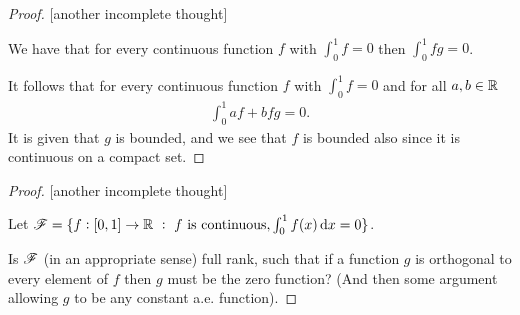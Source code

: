 \begin{proof}

  [another incomplete thought]

  We have that for every continuous function $f$ with $\int_0^1 f = 0$ then $\int_0^1 fg = 0$.

  It follows that for every continuous function $f$ with $\int_0^1 f = 0$ and for all $a, b \in \mathbb{R}$
  \begin{align*}
    \int_0^1 af + bfg = 0.
  \end{align*}
  It is given that $g$ is bounded, and we see that $f$ is bounded also since it is continuous on a compact set.

\end{proof}


\begin{proof}

  [another incomplete thought]

  Let $\ms F = \{f: [0, 1] \to \R ~:~ f \text{~is continuous}, \int_0^1 f(x) \dx = 0 \}$.

  Is $\mathscr F$ (in an appropriate sense) full rank, such that if a function $g$ is orthogonal to every element
  of $f$ then $g$ must be the zero function? (And then some argument allowing $g$ to be any constant a.e.
  function).
\end{proof}












